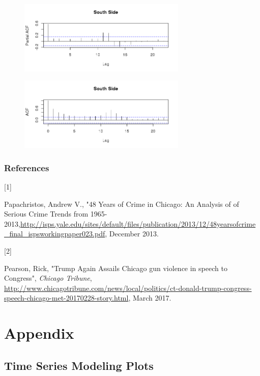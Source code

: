 \documentclass{article} %
\begin{document}
\begin{multicols}{2}
\begin{figure}[H]
\includegraphics[width = 80mm]{Plots/south_PACF.png}
\end{figure}

\begin{figure}[H]
\includegraphics[width=80mm]{Plots/south_ACF.png}
\end{figure}

\end{multicols}

\newpage


\subsubsection*{References}


\hypertarget{Ref1}{[1]} Papachristos, Andrew V., "48 Years of Crime in Chicago: An Analysis of of Serious Crime Trends from 1965-2013,\url{http://isps.yale.edu/sites/default/files/publication/2013/12/48yearsofcrime_final_ispsworkingpaper023.pdf}, December 2013.

\hypertarget{Ref2}{[2]} Pearson, Rick, "Trump Again Assails Chicago gun violence in speech to Congress", \textit{Chicago Tribune}, \url{http://www.chicagotribune.com/news/local/politics/ct-donald-trump-congress-speech-chicago-met-20170228-story.html}, March 2017.


\clearpage
\newpage

\section{Appendix}
\label{headings}


\subsection{Time Series Modeling Plots}
\label{appendix_regression}
\end{document}
